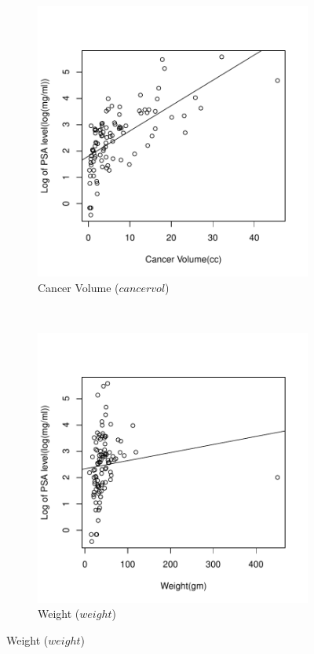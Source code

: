 \documentclass[12pt,letterpaper,titlepage,en-US]{article}
\begin{document}
\begin{figure}[H]
    \centering
    \begin{subfigure}[t]{0.5\textwidth}
        \centering
        \caption{Cancer Volume ($cancervol$)}
        \includegraphics[width=.96\textwidth]{fig/boxplotcancervol.pdf}
    \end{subfigure}%
    ~
    \begin{subfigure}[t]{0.5\textwidth}
        \centering
        \caption{Weight ($weight$)}
        \includegraphics[width=.96\textwidth]{fig/boxplotweight.pdf}

\end{subfigure}
\end{figure}
\end{document}
